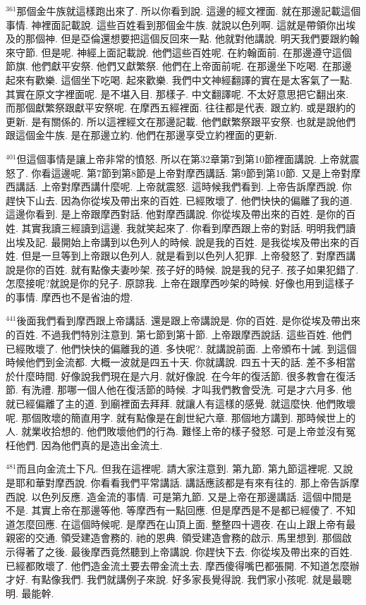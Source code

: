 \documentclass{book}
\begin{document}
$^{361}$那個金牛族就這樣跑出來了.
所以你看到說.
這邊的經文裡面.
就在那邊記載這個事情.
神裡面記載說.
這些百姓看到那個金牛族.
就說以色列啊.
這就是帶領你出埃及的那個神.
但是亞倫還想要把這個反回來一點.
他就對他講說.
明天我們要跟約翰來守節.
但是呢.
神經上面記載說.
他們這些百姓呢.
在約翰面前.
在那邊遵守這個節旗.
他們獻平安祭.
他們又獻繁祭.
他們在上帝面前呢.
在那邊坐下吃喝.
在那邊起來有歡樂.
這個坐下吃喝.
起來歡樂.
我們中文神經翻譯的實在是太客氣了一點.
其實在原文字裡面呢.
是不堪入目.
那樣子.
中文翻譯呢.
不太好意思把它翻出來.
而那個獻繁祭跟獻平安祭呢.
在摩西五經裡面.
往往都是代表.
跟立約.
或是跟約的更新.
是有關係的.
所以這裡經文在那邊記載.
他們獻繁祭跟平安祭.
也就是說他們跟這個金牛族.
是在那邊立約.
他們在那邊享受立約裡面的更新.

$^{401}$但這個事情是讓上帝非常的憤怒.
所以在第32章第7到第10節裡面講說.
上帝就震怒了.
你看這邊呢.
第7節到第8節是上帝對摩西講話.
第9節到第10節.
又是上帝對摩西講話.
上帝對摩西講什麼呢.
上帝就震怒.
這時候我們看到.
上帝告訴摩西說.
你趕快下山去.
因為你從埃及帶出來的百姓.
已經敗壞了.
他們快快的偏離了我的道.
這邊你看到.
是上帝跟摩西對話.
他對摩西講說.
你從埃及帶出來的百姓.
是你的百姓.
其實我讀三經讀到這邊.
我就笑起來了.
你看到摩西跟上帝的對話.
明明我們讀出埃及記.
最開始上帝講到以色列人的時候.
說是我的百姓.
是我從埃及帶出來的百姓.
但是一旦等到上帝跟以色列人.
就是看到以色列人犯罪.
上帝發怒了.
對摩西講說是你的百姓.
就有點像夫妻吵架.
孩子好的時候.
說是我的兒子.
孩子如果犯錯了.
怎麼接呢?就說是你的兒子.
原諒我.
上帝在跟摩西吵架的時候.
好像也用到這樣子的事情.
摩西也不是省油的燈.

$^{441}$後面我們看到摩西跟上帝講話.
還是跟上帝講說是.
你的百姓.
是你從埃及帶出來的百姓.
不過我們特別注意到.
第七節到第十節.
上帝跟摩西說話.
這些百姓.
他們已經敗壞了.
他們快快的偏離我的道.
多快呢?.
就講說前面.
上帝頒布十誡.
到這個時候他們到金流都.
大概一波就是四五十天.
你就講說.
四五十天的話.
差不多相當於什麼時間.
好像說我們現在是六月.
就好像說.
在今年的復活節.
很多教會在復活節.
有洗禮.
那哪一個人他在復活節的時候.
才叫我們教會受洗.
可是才六月多.
他就已經偏離了主的道.
到廟裡面去拜拜.
就讓人有這樣的感覺.
就這麼快.
他們敗壞呢.
那個敗壞的簡直用字.
就有點像是在創世紀六章.
那個地方講到.
那時候世上的人.
就業收拾想的.
他們敗壞他們的行為.
難怪上帝的樣子發怒.
可是上帝並沒有冤枉他們.
因為他們真的是造出金流土.

$^{481}$而且向金流土下凡.
但我在這裡呢.
請大家注意到.
第九節.
第九節這裡呢.
又說是耶和華對摩西說.
你看看我們平常講話.
講話應該都是有來有往的.
那上帝告訴摩西說.
以色列反應.
造金流的事情.
可是第九節.
又是上帝在那邊講話.
這個中間是不是.
其實上帝在那邊等他.
等摩西有一點回應.
但是摩西是不是都已經傻了.
不知道怎麼回應.
在這個時候呢.
是摩西在山頂上面.
整整四十週夜.
在山上跟上帝有最親密的交通.
領受建造會務的.
祂的恩典.
領受建造會務的啟示.
馬里想到.
那個啟示得著了之後.
最後摩西竟然聽到上帝講說.
你趕快下去.
你從埃及帶出來的百姓.
已經都敗壞了.
他們造金流土要去帶金流土去.
摩西傻得嘴巴都張開.
不知道怎麼辦才好.
有點像我們.
我們就講例子來說.
好多家長覺得說.
我們家小孩呢.
就是最聰明.
最能幹.
\end{document}
